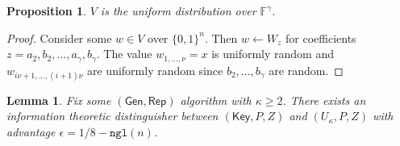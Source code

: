 \documentclass[11pt]{article}
\newtheorem{lemma}[theorem]{Lemma}
\newtheorem{proposition}[theorem]{Proposition}
\newcommand{\class}[1]{{\ensuremath{\mathsf{#1}}}}
\newcommand{\Key}{\ensuremath{\class{Key}}\xspace}
\newcommand{\gen}{\ensuremath{\class{Gen}}\xspace}
\newcommand{\rep}{\ensuremath{\class{Rep}}\xspace}
\newcommand{\zo}{\ensuremath{\{0, 1\}}}
\newcommand{\ngl}{\ensuremath{\mathtt{ngl}}\xspace}
\begin{document}
\begin{proposition}\label{prop:dist uniform fuzz}
$V$ is the uniform distribution over $\mathbb{F}^\gamma$.
\end{proposition}
\begin{proof}
Consider some $w\in V$ over $\zo^n$.  Then $w\leftarrow W_z$ for coefficients $z=a_2, b_2, ..., a_\gamma , b_\gamma$.  The value $w_{1,...,\nu} =x $ is uniformly random and $w_{i\nu+1,...,(i+1)\nu}$ are uniformly random since $b_2,..., b_\gamma$ are random.
\end{proof}

\begin{lemma}
\label{lem:fuzz can't get key}
Fix some $(\gen, \rep)$ algorithm with $\kappa \ge 2$.  There exists an information theoretic distinguisher between $(\Key, P, Z)$ and $(U_\kappa, P, Z)$ with advantage $\epsilon = 1/8-\ngl(n)$.
\end{lemma}
\end{document}
